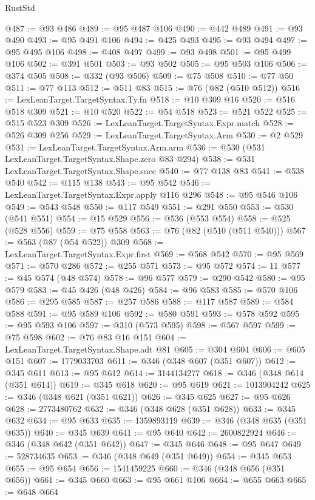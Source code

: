 \begin{lexlean}{RustStd}
\begin{coremodule}
{\begin{coremodule}
{{{{{{{{{{{{{{{{{{{{{{{{{{{{{{{{{{{{{{{@487 := @93 @486
@489 := @95 @487 @106
@490 := @442 @489
@491 := @93 @490
@493 := @95 @491 @106
@494 := @425 @493
@495 := @93 @494
@497 := @95 @495 @106
@498 := @408 @497
@499 := @93 @498
@501 := @95 @499 @106
@502 := @391 @501
@503 := @93 @502
@505 := @95 @503 @106
@506 := @374 @505
@508 := @332 (@93 @506)
@509 := @75 @508
@510 := @77 @50
@511 := @77 @113
@512 := @511 @83
@515 := @76 (@82 (@510 @512))
@516 := LexLeanTarget.TargetSyntax.Ty.fn
@518 := @10 @309 @16
@520 := @516 @518 @309
@521 := @10 @520
@522 := @54 @518
@523 := @521 @522
@525 := @515 @523 @309
@526 := LexLeanTarget.TargetSyntax.Expr.match
@528 := @526 @309 @256
@529 := LexLeanTarget.TargetSyntax.Arm
@530 := @2 @529
@531 := LexLeanTarget.TargetSyntax.Arm.arm
@536 := @530 (@531 LexLeanTarget.TargetSyntax.Shape.zero @83 @294)
@538 := @531 LexLeanTarget.TargetSyntax.Shape.succ
@540 := @77 @138 @83
@541 := @538 @540
@542 := @115 @138
@543 := @95 @542
@546 := LexLeanTarget.TargetSyntax.Expr.apply @116 @296
@548 := @95 @546 @106
@549 := @543 @548
@550 := @117 @549
@551 := @291 @550
@553 := @530 (@541 @551)
@554 := @15 @529
@556 := @536 (@553 @554)
@558 := @525 (@528 @556)
@559 := @75 @558
@563 := @76 (@82 (@510 (@511 @540)))
@567 := @563 (@87 (@54 @522)) @309
@568 := LexLeanTarget.TargetSyntax.Expr.first
@569 := @568 @542
@570 := @95 @569
@571 := @570 @286
@572 := @255 @571
@573 := @95 @572
@574 := 11
@577 := @45 @574 (@48 @574)
@578 := @96 @577
@579 := @290 @542
@580 := @95 @579
@583 := @45 @426 (@48 @426)
@584 := @96 @583
@585 := @570 @106
@586 := @295 @585
@587 := @257 @586
@588 := @117 @587
@589 := @584 @588
@591 := @95 @589 @106
@592 := @580 @591
@593 := @578 @592
@595 := @95 @593 @106
@597 := @310 (@573 @595)
@598 := @567 @597
@599 := @75 @598
@602 := @76 @83 @16 @151
@604 := LexLeanTarget.TargetSyntax.Shape.adt @81
@605 := @304 @604
@606 := @605 @151
@607 := 1779033703
@611 := @346 (@348 @607 (@351 @607))
@612 := @345 @611
@613 := @95 @612
@614 := 3144134277
@618 := @346 (@348 @614 (@351 @614))
@619 := @345 @618
@620 := @95 @619
@621 := 1013904242
@625 := @346 (@348 @621 (@351 @621))
@626 := @345 @625
@627 := @95 @626
@628 := 2773480762
@632 := @346 (@348 @628 (@351 @628))
@633 := @345 @632
@634 := @95 @633
@635 := 1359893119
@639 := @346 (@348 @635 (@351 @635))
@640 := @345 @639
@641 := @95 @640
@642 := 2600822924
@646 := @346 (@348 @642 (@351 @642))
@647 := @345 @646
@648 := @95 @647
@649 := 528734635
@653 := @346 (@348 @649 (@351 @649))
@654 := @345 @653
@655 := @95 @654
@656 := 1541459225
@660 := @346 (@348 @656 (@351 @656))
@661 := @345 @660
@663 := @95 @661 @106
@664 := @655 @663
@665 := @648 @664
}}}}}}}}}}}}}}}}}}}}}}}}}}}}}}}}}}}}}}}
\end{coremodule}}
\end{coremodule}
\end{lexlean}
